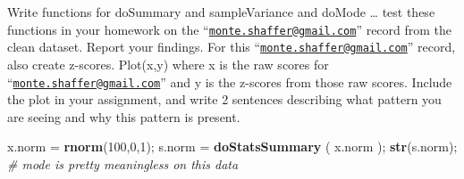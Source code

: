 \documentclass[
]{article}
\newenvironment{Shaded}{\begin{snugshade}}{\end{snugshade}}
\newcommand{\CommentTok}[1]{\textcolor[rgb]{0.56,0.35,0.01}{\textit{#1}}}
\newcommand{\DecValTok}[1]{\textcolor[rgb]{0.00,0.00,0.81}{#1}}
\newcommand{\KeywordTok}[1]{\textcolor[rgb]{0.13,0.29,0.53}{\textbf{#1}}}
\newcommand{\NormalTok}[1]{#1}
\newcommand{\StringTok}[1]{\textcolor[rgb]{0.31,0.60,0.02}{#1}}
\begin{document}
Write functions for doSummary and sampleVariance and doMode \ldots{}
test these functions in your homework on the
``\href{mailto:monte.shaffer@gmail.com}{\nolinkurl{monte.shaffer@gmail.com}}''
record from the clean dataset. Report your findings. For this
``\href{mailto:monte.shaffer@gmail.com}{\nolinkurl{monte.shaffer@gmail.com}}''
record, also create z-scores. Plot(x,y) where x is the raw scores for
``\href{mailto:monte.shaffer@gmail.com}{\nolinkurl{monte.shaffer@gmail.com}}''
and y is the z-scores from those raw scores. Include the plot in your
assignment, and write 2 sentences describing what pattern you are seeing
and why this pattern is present.

\begin{Shaded}
\begin{Highlighting}[]
\NormalTok{x.norm =}\StringTok{ }\KeywordTok{rnorm}\NormalTok{(}\DecValTok{100}\NormalTok{,}\DecValTok{0}\NormalTok{,}\DecValTok{1}\NormalTok{);}
\NormalTok{s.norm =}\StringTok{ }\KeywordTok{doStatsSummary}\NormalTok{ ( x.norm );}
\KeywordTok{str}\NormalTok{(s.norm);  }\CommentTok{# mode is pretty meaningless on this data}
\end{Highlighting}
\end{Shaded}
\end{document}
